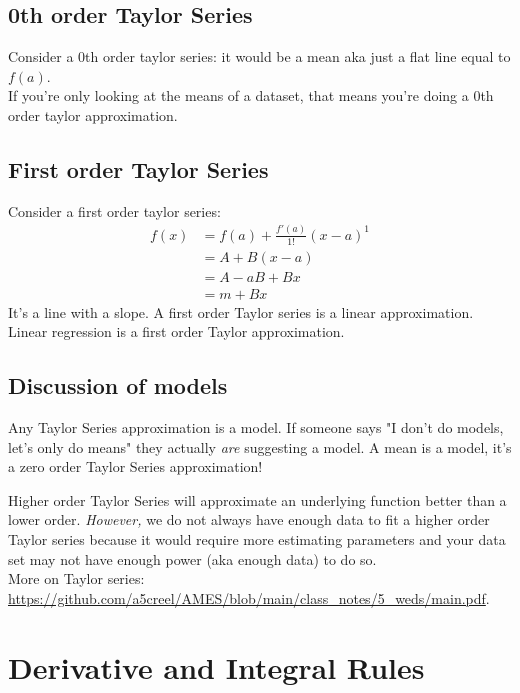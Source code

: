 \documentclass{article}
\begin{document}
\subsection{0th order Taylor Series}
Consider a 0th order taylor series: it would be a mean aka just a flat line equal to $f(a)$. \\

If you're only looking at the means of a dataset, that means you're doing a 0th order taylor approximation.

\subsection{First order Taylor Series}

Consider a first order taylor series: 
\begin{align}
    f(x) &= f(a) + \frac{f'(a)}{1!}(x-a)^1 \\
    &= A + B (x-a) \\
    &= A -aB + Bx\\
    &= m + Bx
\end{align}
It's a line with a slope. A first order Taylor series is a linear approximation. Linear regression is a first order Taylor approximation. \\

\subsection{Discussion of models}
Any Taylor Series approximation is a model. If someone says "I don't do models, let's only do means" they actually \textit{are} suggesting a model. A mean is a model, it's a zero order Taylor Series approximation! 

Higher order Taylor Series will approximate an underlying function better than a lower order. \textit{However,} we do not always have enough data to fit a higher order Taylor series because it would require more estimating parameters and your data set may not have enough power (aka enough data) to do so. \\

More on Taylor series: \url{https://github.com/a5creel/AMES/blob/main/class_notes/5_weds/main.pdf}. 


\section{Derivative and Integral Rules}
\end{document}
